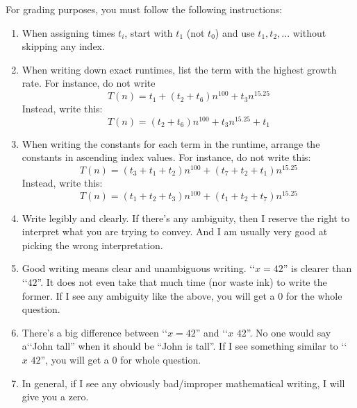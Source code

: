 For grading purposes, you must follow the following instructions:
\begin{enumerate}[nosep]
\item When assigning times $t_i$, start with $t_1$ (not $t_0$)
and use $t_1, t_2, ...$ without skipping any index.
\item When writing down exact runtimes, list the term with the highest
growth rate. For instance, do not write
\[
T(n) = t_1 + (t_2 + t_6)n^{100} + t_3 n^{15.25}
\]
Instead, write this:
\[
T(n) = (t_2 + t_6)n^{100} + t_3 n^{15.25} + t_1 
\]
\item When writing the constants for each term in the runtime, arrange the
constants in ascending index values. For instance, do not write this:
\[
T(n) = (t_3 + t_1 + t_2) n^{100} + (t_7 + t_2 + t_1) n^{15.25}
\]
Instead, write this:
\[
T(n) = (t_1 + t_2 + t_3) n^{100} + (t_1 + t_2 + t_7) n^{15.25}
\]
\item Write legibly and clearly. If there's any ambiguity, then I
reserve the right to interpret what you are trying to convey.
And I am usually very good at picking the wrong interpretation.
\item Good writing means clear and unambiguous writing.
\lq\lq $x = 42$'' is clearer than \lq\lq $42$''.
It does not even take that much time (nor waste ink) to write the former.
If I see any ambiguity like the above, you will get a 0 for the whole question.

\item
There's a big difference between \lq\lq $x = 42$'' and \lq\lq $x \, \, 42$''.
No one would say
a\lq\lq John tall'' when it should be
``John is tall''.
If I see something similar to
\lq\lq $x \, \, 42$'', you will get a 0 for whole question.

\item In general, if I see any obviously bad/improper mathematical writing,
I will give you a zero.

\end{enumerate}
